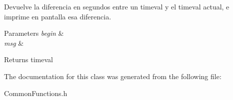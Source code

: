 Devuelve la diferencia en segundos entre un timeval y el timeval actual, e imprime en pantalla esa diferencia. 


\begin{DoxyParams}{Parameters}
{\em begin} & \\
\hline
{\em msg} & \\
\hline
\end{DoxyParams}
\begin{DoxyReturn}{Returns}
timeval 
\end{DoxyReturn}


The documentation for this class was generated from the following file\+:\begin{DoxyCompactItemize}
\item 
Common\+Functions.\+h\end{DoxyCompactItemize}
